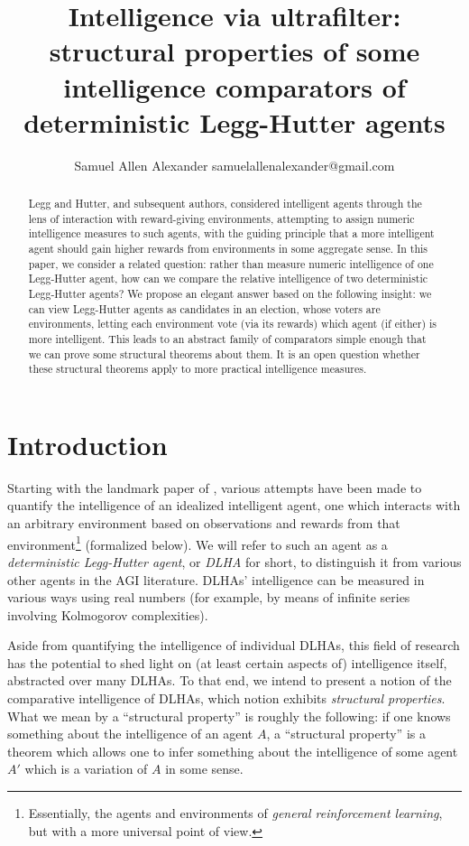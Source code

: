\documentclass[twoside,11pt]{article}
\author{\name Samuel Allen Alexander \email samuelallenalexander@gmail.com}
\title{Intelligence via ultrafilter: structural properties of some intelligence
comparators of deterministic Legg-Hutter agents}
\begin{document}
\maketitle

\begin{abstract}
    Legg and Hutter, and subsequent authors, considered intelligent agents
    through the lens of interaction with reward-giving
    environments, attempting to
    assign numeric intelligence measures to such agents, with the guiding
    principle that a more intelligent agent should gain higher rewards
    from environments in some aggregate sense.
    In this paper, we consider a related question: rather than measure
    numeric intelligence of one Legg-Hutter agent, how can we compare the
    relative intelligence
    of two deterministic Legg-Hutter agents? We propose an elegant answer based on
    the following insight:
    we can view Legg-Hutter agents as candidates in an election, whose voters are
    environments, letting each environment vote (via its rewards) which
    agent (if either) is more intelligent. This leads to an abstract
    family of comparators simple enough that we can prove
    some structural theorems about them. It is an open question whether
    these structural theorems apply to more practical intelligence measures.
\end{abstract}

\section{Introduction}

Starting with the landmark paper of \citet{hutter2007}, various
attempts \citep{hernandez, hibbard} have been
made to quantify the intelligence of an idealized intelligent agent, one which interacts
with an arbitrary environment based on observations and
rewards from that environment\footnote{Essentially, the agents and environments
of \emph{general reinforcement learning}, but with a more universal
point of view.}
(formalized
below).
We will refer to such an agent as a \emph{deterministic Legg-Hutter agent},
or \emph{DLHA} for short, to distinguish it from various other agents
in the AGI literature.
DLHAs' intelligence can be measured in
various ways using real numbers (for example, by
means of infinite series involving Kolmogorov complexities).

Aside from quantifying the intelligence of individual DLHAs, this field
of research has the potential to shed light on (at least certain aspects of)
intelligence itself,
abstracted over many DLHAs.
To that end, we intend to present a notion of the comparative
intelligence of DLHAs, which notion exhibits
\emph{structural properties}. What we mean by
a ``structural property'' is roughly the following: if one knows something about the
intelligence of an agent $A$, a ``structural property'' is a theorem which allows one
to infer something about the intelligence of some agent $A'$ which is a variation of
$A$ in some sense.
\end{document}
